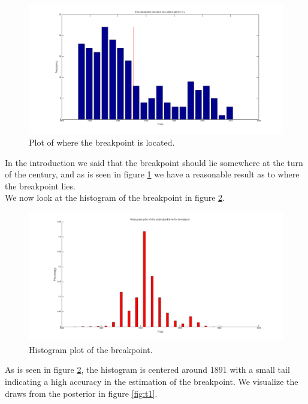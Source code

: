 \begin{figure}[H]
\centering
\includegraphics[scale=0.26]{./Figures/bp1.png}
\caption{Plot of where the breakpoint is located.}
\label{fig:bp1}
\end{figure}

In the introduction we said that the breakpoint should lie somewhere at the turn of the century, and as is seen in figure \ref{fig:bp1} we have a reasonable result as to where the breakpoint lies. \\ We now look at the histogram of the breakpoint in figure \ref{fig:tpost1}.

\begin{figure}[H]
\centering
\includegraphics[scale=0.26]{./Figures/tpost1.png}
\caption{Histogram plot of the breakpoint.}
\label{fig:tpost1}
\end{figure}

As is seen in figure \ref{fig:tpost1}, the histogram is centered around 1891 with a small tail indicating a high accuracy in the estimation of the breakpoint. We visualize the draws from the posterior in figure \ref{fig:t1}.

